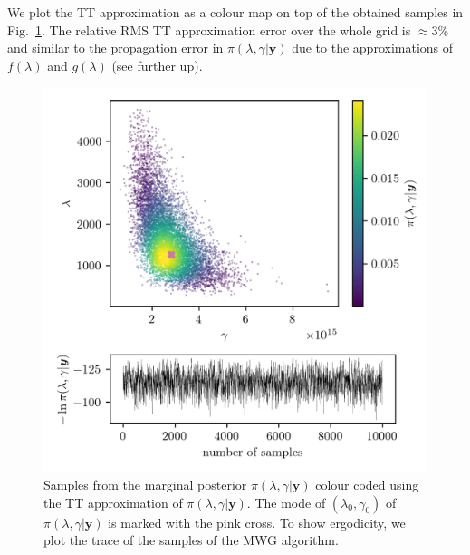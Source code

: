 We plot the TT approximation as a colour map on top of the obtained samples in Fig.~\ref{fig:ScatterPlotTT}.
The relative RMS TT approximation error over the whole grid is $\approx 3\%$ and similar to the propagation error in $\pi(\lambda, \gamma| \bm{y})$ due to the approximations of $f(\lambda)$ and $g(\lambda)$ (see further up).
\begin{figure}[h!]
	\centering
	\includegraphics{ScatterplusHistoPlusTT.png}
	\caption[Samples from marginal posterior and TT approximation; trace plot of the MWG for $\pi(\lambda, \gamma| \bm{y})$]{Samples from the marginal posterior $\pi(\lambda , \gamma  | \bm{y})$ colour coded using the TT approximation of $\pi(\lambda , \gamma  | \bm{y})$. The mode of $(\lambda_0 , \gamma_0)$ of $\pi(\lambda , \gamma  | \bm{y})$ is marked with the pink cross. To show ergodicity, we plot the trace of the samples of the MWG algorithm.}
	\label{fig:ScatterPlotTT}
\end{figure}

